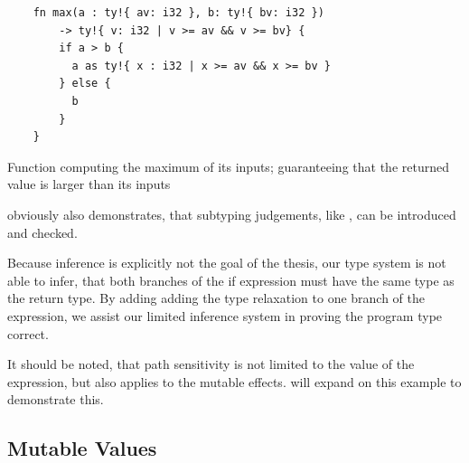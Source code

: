 \documentclass[twoside, english]{sdqthesis}
\theoremstyle{definition}
\begin{document}
\begin{listing}[h]
  \begin{verbatim}
    fn max(a : ty!{ av: i32 }, b: ty!{ bv: i32 })
        -> ty!{ v: i32 | v >= av && v >= bv} {
        if a > b {
          a as ty!{ x : i32 | x >= av && x >= bv }
        } else {
          b
        }
    }
  \end{verbatim}
  \caption{Function computing the maximum of its inputs; guaranteeing that the returned value is larger than its inputs}
  \label{lst:max-path-sensitive}
\end{listing}


 obviously also demonstrates, that subtyping judgements, like , can be introduced and checked.

Because inference is explicitly not the goal of the thesis, our type system is not able to infer, that both branches of the if expression must have the same type as the return type. By adding adding the type relaxation to one branch of the expression, we assist our limited inference system in proving the program type correct.

It should be noted, that path sensitivity is not limited to the value of the expression, but also applies to the mutable effects.  will expand on this example to demonstrate this.

\subsection{Mutable Values}
\end{document}
